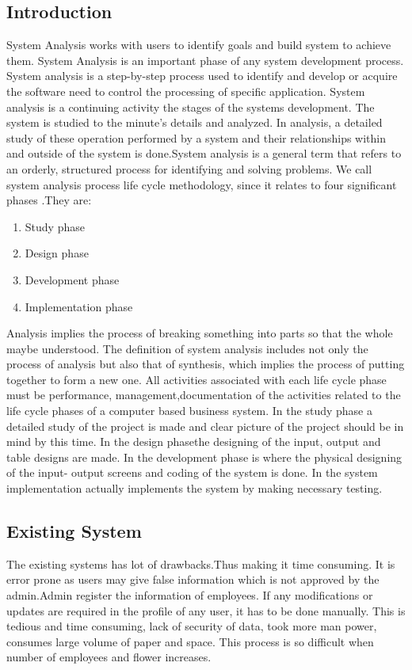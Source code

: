 \documentclass[a4paper,12pt]{article}
\begin{document}
\subsection{Introduction}\vspace{5mm}
System Analysis works with users to identify goals and build system to achieve them. System Analysis is an important phase of any system development process.  System analysis is a step-by-step process used to identify and develop or acquire the software need to control the processing of specific application. System analysis is a continuing activity the stages of the systems development. The system is studied to the minute’s details and analyzed. In analysis, a detailed study of these operation performed by a system and their relationships within and outside of the system is done.System analysis is a general term that refers to an orderly, structured process for identifying and solving problems. We call system analysis process life cycle methodology, since it relates to four significant phases .They are:\vspace{2mm}
\begin{enumerate}
\item Study phase
\item Design phase
\item Development phase
\item Implementation phase
\end{enumerate}
\par\vspace{2mm}
Analysis implies the process of breaking something into parts so that the whole maybe understood. The definition of system analysis includes not only the process of analysis but also that of synthesis, which implies the process of putting together to form a new one. All activities associated with each life cycle phase must be performance, management,documentation of the activities related to the life cycle phases of a computer based business system. In the study phase a detailed study of the project is made and clear picture of the project should be in mind by this time. In the design phasethe designing of the input, output and table designs are made. In the development phase is where the physical designing of the  input- output screens and coding of the system is done. In the system implementation actually implements the system by making necessary testing.
\subsection{Existing System}\vspace{5mm}
The existing systems has lot of drawbacks.Thus making it time consuming. It is error prone as users may give false information which is not approved by the admin.Admin register the information of employees. If any modifications or updates are required in the profile of any user, it has to be done manually. This is tedious and time consuming, lack of security of data, took more man power, consumes large volume of paper and space. This process is so difficult when number of employees and flower increases. 
\end{document}
